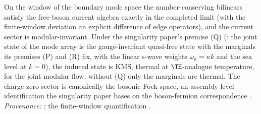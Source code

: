 On the window of the boundary mode space the number-conserving bilinears satisfy the free-boson current algebra exactly in the completed limit (with the finite-window deviation an explicit difference of edge operators), and the current sector is modular-invariant. Under the singularity paper's premise (Q) (\cite[Premise~8.1]{ButlerT5}: the joint state of the mode array is the gauge-invariant quasi-free state with the marginals its premises (P) and (R) fix, with the linear s-wave weights $\omega_k = \kappa k$ and the sea level at $k = 0$), the induced state is KMS, thermal at $\TH$-analogue temperature, for the joint modular flow; without (Q) only the marginals are thermal. The charge-zero sector is canonically the bosonic Fock space, an assembly-level identification the singularity paper bases on the boson-fermion correspondence \cite{PressleySegal1986}. \emph{Provenance:} \cite[\S 8, Premise~8.1]{ButlerT5}; the finite-window quantification \cite[\S 6]{ButlerT7}.
